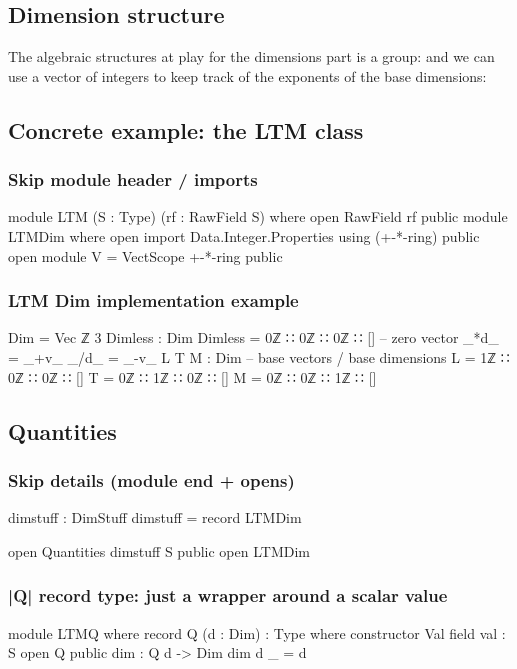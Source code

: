 \documentclass{article}
\begin{document}
\subsection{Dimension structure}
\label{sec:orgd044122}
The algebraic structures at play for the dimensions part is a group:
and we can use a vector of integers to keep track of the exponents of
the base dimensions:

\subsection{Concrete example: the LTM class}
\label{sec:org58f9714}
\subsubsection{Skip module header / imports}
\label{sec:orgc1be1b5}
\begin{code}
module LTM (S : Type) (rf : RawField S) where
  open RawField rf public
  module LTMDim where
    open import Data.Integer.Properties using (+-*-ring) public
    open module V = VectScope +-*-ring public
\end{code}
\subsubsection{LTM Dim implementation example}
\label{sec:orgef10fd0}
\begin{code}
    Dim = Vec ℤ 3
    Dimless : Dim
    Dimless  = 0ℤ ∷ 0ℤ ∷ 0ℤ ∷ [] -- zero vector
    _*d_ = _+v_
    _/d_ = _-v_
    L T M : Dim -- base vectors / base dimensions
    L        = 1ℤ ∷ 0ℤ ∷ 0ℤ ∷ []
    T        = 0ℤ ∷ 1ℤ ∷ 0ℤ ∷ []
    M        = 0ℤ ∷ 0ℤ ∷ 1ℤ ∷ []
\end{code}
\subsection{Quantities}
\label{sec:org52ece7d}
\subsubsection{Skip details (module end + opens)}
\label{sec:org22e4838}
\begin{code}
  dimstuff : DimStuff
  dimstuff = record { LTMDim }

  open Quantities dimstuff S public
  open LTMDim
\end{code}
\subsubsection{|Q| record type: just a wrapper around a scalar value}
\label{sec:org235f1bd}
\begin{code}
  module LTMQ where
    record Q (d : Dim) : Type where
      constructor Val
      field
        val : S
    open Q public
    dim : Q d -> Dim
    dim {d} _ = d
\end{code}
\end{document}
